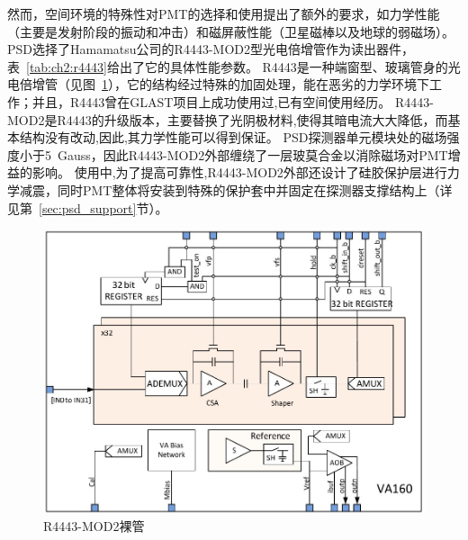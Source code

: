 然而，空间环境的特殊性对PMT的选择和使用提出了额外的要求，如力学性能（主要是发射阶段的振动和冲击）和磁屏蔽性能（卫星磁棒以及地球的弱磁场）。
PSD选择了Hamamatsu公司的R4443-MOD2型光电倍增管作为读出器件，表~\ref{tab:ch2:r4443}给出了它的具体性能参数。
R4443是一种端窗型、玻璃管身的光电倍增管（见图~\ref{fig:ch2:r4443_rare}），它的结构经过特殊的加固处理，能在恶劣的力学环境下工作；并且，R4443曾在GLAST项目上成功使用过,已有空间使用经历。
R4443-MOD2是R4443的升级版本，主要替换了光阴极材料,使得其暗电流大大降低，而基本结构没有改动,因此,其力学性能可以得到保证。
PSD探测器单元模块处的磁场强度小于\SI{5}{Gauss}，因此R4443-MOD2外部缠绕了一层玻莫合金以消除磁场对PMT增益的影响。
使用中,为了提高可靠性,R4443-MOD2外部还设计了硅胶保护层进行力学减震，同时PMT整体将安装到特殊的保护套中并固定在探测器支撑结构上（详见第~\ref{sec:psd_support}节）。

\begin{figure}[h!]
\centering
\includegraphics[width=0.8\linewidth]{chap/description/fig/va160}
\caption{R4443-MOD2裸管}
\label{fig:ch2:r4443_rare}
\end{figure}

